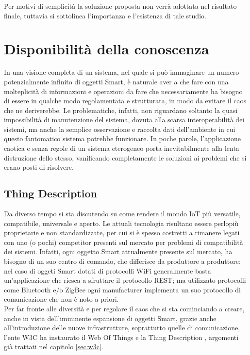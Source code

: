 \documentclass[12pt,a4paper,openright,oneside]{report}
\begin{document}
Per motivi di semplicità la soluzione proposta non verrà adottata nel risultato finale, tuttavia si sottolinea l'importanza e l'esistenza di tale studio.


\section{Disponibilità della conoscenza}
In una visione completa di un sistema, nel quale si può immaginare un numero potenzialmente infinito di oggetti Smart, è naturale aver a che fare con una molteplicità di informazioni e operazioni da fare che necessariamente ha bisogno di essere in qualche modo regolamentata e strutturata, in modo da evitare il caos che ne deriverebbe. Le problematiche, infatti, non riguardano soltanto la quasi impossibilità di manutenzione del sistema, dovuta alla scarsa interoperabilità dei sistemi, ma anche la semplice osservazione e raccolta dati dell'ambiente in cui questo fantomatico sistema potrebbe funzionare. In poche parole, l'applicazione caotica e senza regole di un sistema eterogeneo porta inevitabilmente alla lenta distruzione dello stesso, vanificando completamente le soluzioni ai problemi che si erano posti di risolvere.


\subsection{Thing Description}
\label{sec:td}
Da diverso tempo si sta discutendo su come rendere il mondo IoT più versatile, compatibile, universale e aperto. Le attuali tecnologia risultano essere perlopiù proprietarie e non standardizzate, per cui si è spesso costretti a rimanere legati con uno (o pochi) competitor presenti sul mercato per problemi di compatibilità dei sistemi. Infatti, ogni oggetto Smart attualmente presente sul mercato, ha bisogno di un suo centro di comando, che differisce da produttore a produttore: nel caso di oggeti Smart dotati di protocolli WiFi generalmente basta un'applicazione che riesca a sfruttare il protocollo REST; ma utilizzato protocolli come Bluetooth e/o ZigBee ogni manufacturer implementa un suo protocollo di comunicazione che non è noto a priori.\\

Per far fronte alle diversità e per regolare il caos che si sta cominciando a creare, anche in vista dell'imminente espansione di oggetti Smart, grazie anche all'introduzione delle nuove infrastrutture, soprattutto quelle di comunicazione, l'ente W3C \cite{w3c} ha instaurato il Web Of Things \cite{wot} e la Thing Description \cite{td}, argomenti già trattati nel capitolo \ref{sec:w3c}.\\
\end{document}
